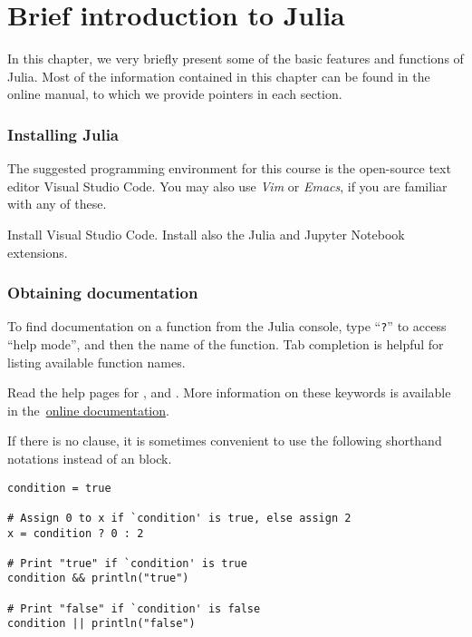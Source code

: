 \chapter{Brief introduction to Julia}%
\label{cha:a_very_short_introduction_to_julia}

In this chapter,
we very briefly present  some of the basic features and functions of Julia.
Most of the information contained in this chapter can be found in the online manual,
to which we provide pointers in each section.

\subsection*{Installing Julia}%
\label{sub:installing_julia}
The suggested programming environment for this course is the open-source text editor Visual Studio Code.
You may also use \emph{Vim} or \emph{Emacs},
if you are familiar with any of these.

\begin{task}
    Install Visual Studio Code.
    Install also the Julia and Jupyter Notebook extensions.
\end{task}

\subsection*{Obtaining documentation}%
\label{sub:getting_documentation}

To find documentation on a function from the Julia console,
type ``\texttt{?}'' to access ``help mode'', and then the name of the function.
Tab completion is helpful for listing available function names.

\begin{task}
    Read the help pages for ,  and .
    More information on these keywords is available in the~\href{https://docs.julialang.org/en/v1/manual/control-flow/} {online documentation}.
\end{task}


\begin{remark}
If there is no  clause,
it is sometimes convenient to use the following shorthand notations instead of an  block.
\begin{verbatim}
condition = true

# Assign 0 to x if `condition' is true, else assign 2
x = condition ? 0 : 2

# Print "true" if `condition' is true
condition && println("true")

# Print "false" if `condition' is false
condition || println("false")
\end{verbatim}
\end{remark}

